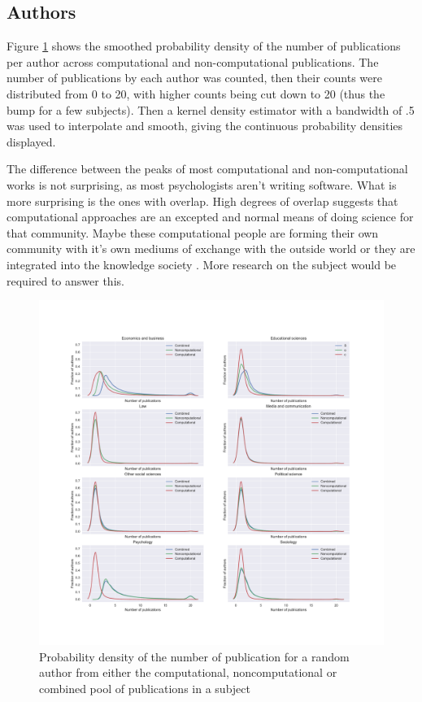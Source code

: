 \documentclass[12pt, a4paper]{article}
\begin{document}
\subsection{Authors}

Figure \ref{auths} shows the smoothed probability density of the number of publications per author across computational and non-computational publications. The number of publications by each author was counted, then their counts were distributed from 0 to 20, with higher counts being cut down to 20 (thus the bump for a few subjects). Then a kernel density estimator with a bandwidth of .5 was used to interpolate and smooth, giving the continuous probability densities displayed.

The difference between the peaks of most computational and non-computational works is not surprising, as most psychologists aren't writing software. What is more surprising is the ones with overlap. High degrees of overlap suggests that  computational approaches are an excepted and normal means of doing science for that community. Maybe these computational people are forming their own community with it's own mediums of exchange with the outside world \citep{star1989institutional} or they are integrated into the knowledge society \citep{cetina2009epistemic}. More research on the subject would be required to answer this.

\begin{figure}[H]
	\centering
	\begin{adjustbox}{center}
		\includegraphics[width=1.2\textwidth]{auths_dist}
	\end{adjustbox}
	\caption{Probability density of the number of publication for a random author from either the computational, noncomputational or combined pool of publications in a subject}\label{auths}
\end{figure}
\end{document}
